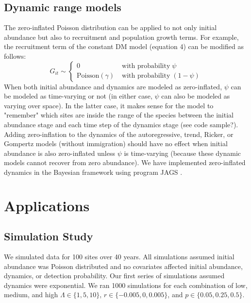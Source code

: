 \documentclass[12pt]{article}
\begin{document}
\subsection{Dynamic range models}

The zero-inflated Poisson distribution can be applied to not only
initial abundance but also to recruitment and population growth terms.
For example, the recruitment term of the constant DM model (equation
4) can be modified as follows:
\begin{equation}
G_{it} \sim \left\{
\begin{aligned}
0 &\; \text{with probability} \; \psi \\
\mathrm{Poisson}(\gamma) &\; \text{with probability} \; (1-\psi)
\end{aligned} \right.
\label{eq:ZIPts}
\end{equation}
When both initial abundance and dynamics are modeled as zero-inflated,
$\psi$ can be modeled as time-varying or not (in either case, $\psi$ can also be
modeled as varying over space).  In the latter case, it makes sense
for the model to "remember" which sites are inside the range of the
species between the initial abundance stage and each time step of the
dynamics stage (see code sample?).  Adding zero-inflation to the
dynamics of the autoregressive, trend, Ricker, or Gompertz models
(without immigration) should have no effect when initial abundance is
also zero-inflated unless $\psi$ is time-varying (because these dynamic
models cannot recover from zero abundance).  We have implemented
zero-inflated dynamics in the Bayesian framework using program
\textrm{JAGS} \citep[version 3.2.0]{plummer:2003}.


\section{Applications}

\subsection{Simulation Study}


We simulated data for 100 sites over 40 years.  All
simulations assumed initial abundance was Poisson distributed
and no covariates affected initial abundance, dynamics, or
detection probability.  Our first series of simulations
assumed dynamics were exponential.  We ran 1000 simulations for
each combination of low, medium, and high $\Lambda \in \{1,5,10\}$, $r
\in \{-0.005, 0, 0.005\}$, and
$p \in \{0.05, 0.25, 0.5\}$. %
\end{document}

